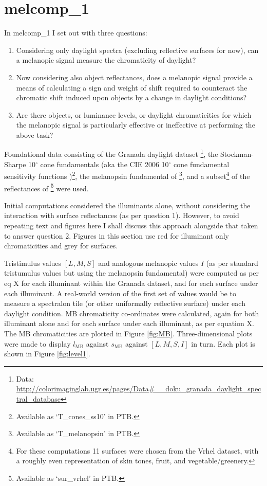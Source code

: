 \section{melcomp\_1}

In melcomp\_1 I set out with three questions:
\begin{enumerate}
\item Considering only daylight spectra (excluding reflective surfaces for now), can a melanopic signal measure the chromaticity of daylight? %
\item Now considering also object reflectances, does a melanopic signal provide a means of calculating a sign and weight of shift required to counteract the chromatic shift induced upon objects by a change in daylight conditions?
\item Are there objects, or luminance levels, or daylight chromaticities for which the melanopic signal is particularly effective or ineffective at performing the above task?
\end{enumerate}

Foundational data consisting of 
the Granada daylight dataset 
\citep{hernandez-andres_color_2001}\footnote{Data: \url{http://colorimaginglab.ugr.es/pages/Data\#__doku_granada_daylight_spectral_database}},
the Stockman-Sharpe 10$^{\circ}$ cone fundamentals 
\citep{stockman_spectral_2000,stockman_spectral_1999}
(aka the CIE 2006 10$^{\circ}$ cone fundamental sensitivity functions \cite{cie_cie_2006})\footnote{Available as `T\_cones\_ss10' in \gls{PTB}.},
the melanopsin fundamental of \citet{lucas_measuring_2014}\footnote{Available as `T\_melanopsin' in \gls{PTB}.},
and a subset\footnote{For these computations 11 surfaces were chosen from the Vrhel dataset, with a roughly even representation of skin tones, fruit, and vegetable/greenery.} 
of the reflectances of \citet{vrhel_measurement_1994}\footnote{Available as `sur\_vrhel' in \gls{PTB}.}
were used.

Initial computations considered the illuminants alone, without considering the interaction with surface reflectances (as per question 1). However, to avoid repeating text and figures here I shall discuss this approach alongside that taken to answer question 2. Figures in this section use red for illuminant only chromaticities and grey for surfaces. 

Tristimulus values $[L,M,S]$ and analogous melanopic values $I$ (as per standard tristumulus values but using the melanopsin fundamental) were computed as per eq X %
for each illuminant within the Granada dataset, and for each surface under each illuminant. A real-world version of the first set of values would be to measure a spectralon tile (or other uniformally reflective surface) under each daylight condition. \gls{MB} chromaticity co-ordinates were calculated, again for both illuminant alone and for each surface under each illuminant, as per equation X. %
The \gls{MB} chromaticities are plotted in Figure \ref{fig:MB}. Three-dimensional plots were made to display $l_{\text{MB}}$ against $s_{\text{MB}}$ against $[L,M,S,I]$ in turn. Each plot is shown in Figure \ref{fig:level1}. 

